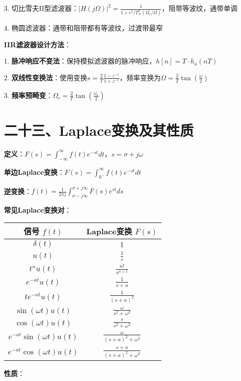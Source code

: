 3. 切比雪夫II型滤波器：$|H(j\Omega)|^2 = \frac{1}{1+\epsilon^2/T_N^2(\Omega_c/\Omega)}$，阻带等波纹，通带单调

4. 椭圆滤波器：通带和阻带都有等波纹，过渡带最窄

\textbf{IIR滤波器设计方法}：

1. \textbf{脉冲响应不变法}：保持模拟滤波器的脉冲响应，$h[n] = T\cdot h_a(nT)$

2. \textbf{双线性变换法}：使用变换$s = \frac{2}{T}\frac{1-z^{-1}}{1+z^{-1}}$，频率变换为$\Omega = \frac{2}{T}\tan(\frac{\omega}{2})$

3. \textbf{频率预畸变}：$\Omega_c = \frac{2}{T}\tan(\frac{\omega_c}{2})$

\section*{二十三、Laplace变换及其性质}

\textbf{定义}：$F(s) = \int_{-\infty}^{\infty}f(t)e^{-st}dt$，$s = \sigma + j\omega$

\textbf{单边Laplace变换}：$F(s) = \int_{0^-}^{\infty}f(t)e^{-st}dt$

\textbf{逆变换}：$f(t) = \frac{1}{2\pi j}\int_{\sigma-j\infty}^{\sigma+j\infty}F(s)e^{st}ds$

\textbf{常见Laplace变换对}：

\begin{tabular}{c|c}
信号 $f(t)$ & Laplace变换 $F(s)$ \\
\hline
$\delta(t)$ & $1$ \\
$u(t)$ & $\frac{1}{s}$ \\
$t^n u(t)$ & $\frac{n!}{s^{n+1}}$ \\
$e^{-at}u(t)$ & $\frac{1}{s+a}$ \\
$te^{-at}u(t)$ & $\frac{1}{(s+a)^2}$ \\
$\sin(\omega t)u(t)$ & $\frac{\omega}{s^2+\omega^2}$ \\
$\cos(\omega t)u(t)$ & $\frac{s}{s^2+\omega^2}$ \\
$e^{-at}\sin(\omega t)u(t)$ & $\frac{\omega}{(s+a)^2+\omega^2}$ \\
$e^{-at}\cos(\omega t)u(t)$ & $\frac{s+a}{(s+a)^2+\omega^2}$ \\
\end{tabular}

\textbf{性质}：

